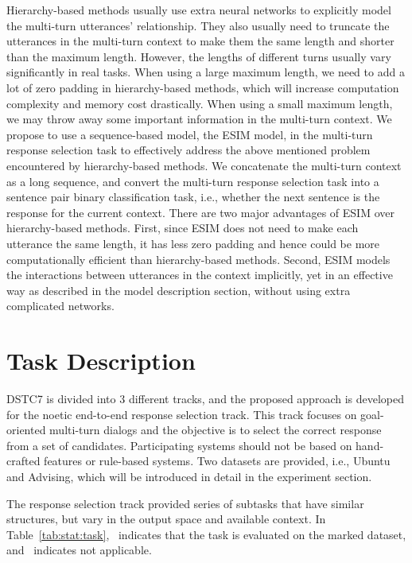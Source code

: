 \documentclass[letterpaper]{article} \usepackage{aaai19}  \usepackage{times}  \usepackage{helvet}  \usepackage{courier}  \usepackage{url}  \usepackage{graphicx}
\newcommand{\cmark}{\ding{51}}\newcommand{\xmark}{\ding{55}}\newcommand{\vect}[1]{\bm{#1}}
\begin{document}
Hierarchy-based methods usually use extra neural
networks to explicitly model the multi-turn utterances' relationship. They also usually need to truncate the utterances in the multi-turn context to make them the same length and shorter than the maximum length. However, the lengths of different turns usually vary significantly in real tasks. When using a large maximum length, we need to add a lot of zero padding in hierarchy-based methods, which will increase computation complexity and memory cost drastically. When using a small maximum length, we may throw away some important information in the multi-turn context. We propose to use a sequence-based model, the ESIM model, in the multi-turn response selection task to effectively address the above mentioned problem encountered by hierarchy-based methods. We concatenate the multi-turn context as a long sequence, and convert the multi-turn response selection task into a sentence pair binary classification task, i.e., whether the next sentence is the response for the current context. There are two major advantages of ESIM over hierarchy-based methods. First, since ESIM does not need to make each utterance the same length, it has less zero padding and hence could be more computationally efficient than hierarchy-based methods. Second, ESIM models the interactions between utterances in the context implicitly, yet in an effective way as described in the model description section, without 
using extra complicated networks.

\section{Task Description}

DSTC7 is divided into 3 different tracks, and the proposed approach is developed for the noetic end-to-end response selection track. This track focuses on goal-oriented multi-turn dialogs and the objective is to select the correct response from a set of candidates. Participating systems should not be based on hand-crafted features or rule-based systems. Two datasets are provided, i.e., Ubuntu and Advising, which will be introduced in detail in the experiment section.

The response selection track provided series of subtasks that have similar structures, but vary in the output space and available context. In Table~\ref{tab:stat:task}, \cmark~indicates that the task is evaluated on the marked dataset, and \xmark~indicates not applicable. 
\end{document}
